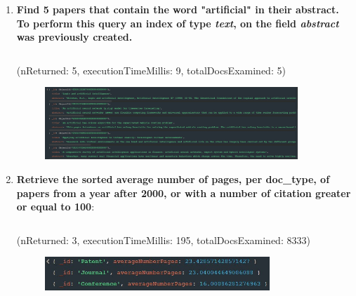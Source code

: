 \documentclass{Configuration_Files/PoliMi3i_thesis}
\begin{document}
\begin{enumerate}
    \item \textbf{Find 5 papers that contain the word "artificial" in their abstract.\\
    To perform this query an index of type \textit{text}, on the field \textit{abstract} was previously created.}
    \inputminted[linenos,tabsize=2,breaklines]{MQL}{code/queries_mongodb/query_3.txt}
    (nReturned: 5, executionTimeMillis: 9, totalDocsExamined: 5)
    \begin{figure}[H]
        \centering
        \includegraphics[width=0.9\textwidth]{Images/queries_mongodb/query_3.jpg}
    \end{figure}
    
    \item \textbf{Retrieve the sorted average number of pages, per doc\_type, of papers from a year after 2000, or with a number of citation greater or equal to 100}:
    \inputminted[linenos,tabsize=2,breaklines]{MQL}{code/queries_mongodb/query_4.txt}
    (nReturned: 3, executionTimeMillis: 195, totalDocsExamined: 8333)
    \begin{figure}[H]
        \centering
        \includegraphics[width=0.8\textwidth]{Images/queries_mongodb/query_4.jpg}
    \end{figure}
    

\end{enumerate}
\end{document}
